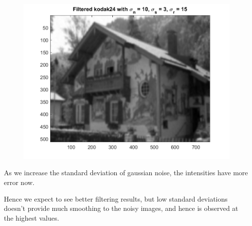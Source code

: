 \documentclass{article}
\begin{document}
\begin{figure}[!htb]
\begin{minipage}[b]{0.3\textwidth}
        \includegraphics[width=\textwidth]{kodak24_10_3_15_18.png}
    \end{minipage}
\end{figure}

As we increase the standard deviation of gaussian noise, the intensities have more error now.

Hence we expect to see better filtering results, but low standard deviations doesn't
provide much smoothing to the noisy images, and hence is observed at the highest values.
\end{document}
